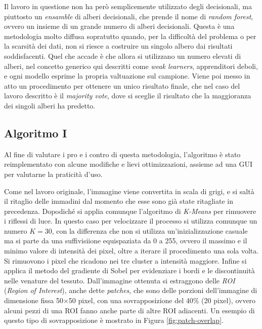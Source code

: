 Il lavoro in questione non ha però semplicemente utilizzato degli decisionali,
ma piuttosto un {\it ensamble} di alberi decisionali, che prende il nome
di {\it random forest}, ovvero un insieme di un grande numero di alberi decisionali.
Questa è una metodologia molto diffusa sopratutto quando, per la difficoltà del
problema o per la scarsità dei dati, non si riesce a costruire un singolo
albero dai risultati soddisfacenti.
Quel che accade è che allora si utilizzano un numero elevati di alberi,
nel concetto generico qui descritti come {\it weak learners}, apprenditori
deboli, e ogni modello esprime la propria valtuazione sul campione.
Viene poi messo in atto un procedimento per ottenere un unico risultato finale,
che nel caso del lavoro descritto è il {\it majority vote}, dove si sceglie
il risultato che la maggioranza dei singoli alberi ha predetto.

\subsection{Algoritmo I}

Al fine di valutare i pro e i contro di questa metodologia, l'algoritmo
è stato reimplementato con alcune modifiche e lievi ottimizzazioni, assieme ad una
GUI per valutarne la praticità d'uso.

Come nel lavoro originale, l'immagine viene convertita in scala di grigi,
e si saltà il ritaglio delle immadini dal momento che esse sono già state
ritagliate in precedenza.
Dopodiché si applia comunque l'algoritmo di {\it K-Means} per rimuovere
i riflessi di luce.
In questo caso per velocizzare il processo si utilizza comunque un numero
$K=30$, con la differenza che non si utilizza un'inizializzazione
casuale ma si parte da una suffivisiione equispaziata da 0 a 255, ovvero
il massimo e il minimo valore di intensità dei pixel, oltre a iterare
il procedimento una sola volta.
Si rimuovono i pixel che ricadono nei tre cluster a intensità maggiore.
Infine si applica il metodo del gradiente di Sobel per evidenziare i bordi
e le discontinuità nelle venature del tessuto.
Dall'immagine ottenuta si estraggono delle {\it ROI} ({\it Region of Interest}),
anche dette {\it patches}, che sono delle porzioni dell'immagine di dimensione
fissa 50$\times$50 pixel, con una sovrapposizione del 40\% (20 pixel), ovvero
alcuni pezzi di una ROI fanno anche parte di altre ROI adiacenti.
Un esempio di questo tipo di sovrapposizione è mostrato in Figura \ref{fig:patch-overlap}.

